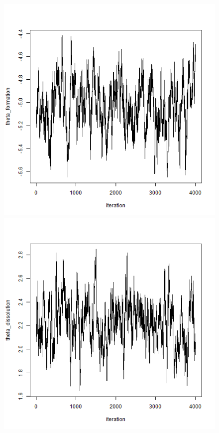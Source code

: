 \documentclass[a4paper, 11pt]{report}
\theoremstyle{definition}
\begin{document}
\begin{figure}[h]
    \begin{center}
        \includegraphics[scale=0.395]{pictures/net3seq_chain1_BSTERGM_formation_traceplot.png}
        \includegraphics[scale=0.395]{pictures/net3seq_chain1_BSTERGM_dissolution_traceplot.png} \\

\end{center}
\end{figure}
\end{document}
